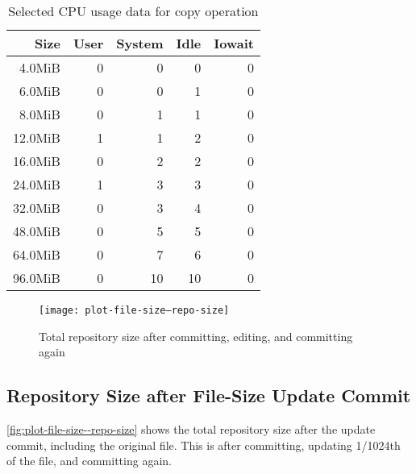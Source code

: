 \begin{table}[p]
    \caption{Selected CPU usage data for copy operation}
    \label{copy-cpu-data}

    \centering
    \begin{tabular}{r r r r r}
        Size & User & System & Idle & Iowait \\
        \midrule
  4.0MiB &    0    &      0    &      0    &      0 \\
  6.0MiB &    0    &      0    &      1    &      0 \\
  8.0MiB &    0    &      1    &      1    &      0 \\
 12.0MiB &    1    &      1    &      2    &      0 \\
 16.0MiB &    0    &      2    &      2    &      0 \\
 24.0MiB &    1    &      3    &      3    &      0 \\
 32.0MiB &    0    &      3    &      4    &      0 \\
 48.0MiB &    0    &      5    &      5    &      0 \\
 64.0MiB &    0    &      7    &      6    &      0 \\
 96.0MiB &    0    &     10    &     10    &      0 \\
    \end{tabular}
\end{table}

%


\begin{figure}[p]
    \begin{leftfullpage}
        \caption{Total repository size after committing, editing, and committing again}
        \label{fig:plot-file-size--repo-size}
        \centering

        \explaindiskspaceplot

        \texttt{[image: plot-file-size--repo-size]}
    \end{leftfullpage}
\end{figure}

\cleardoublepage

\subsection{Repository Size after File-Size Update Commit}

\autoref{fig:plot-file-size--repo-size} shows the total \gls{repository} size
after the update \gls{commit}, including the original file. This is after
committing, updating \num{1/1024}th of the file, and committing again.

